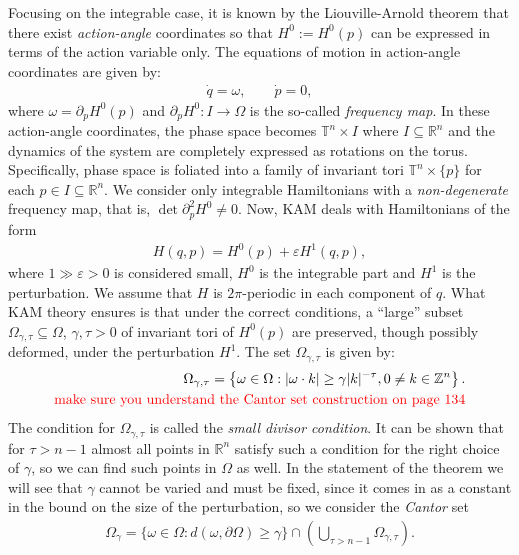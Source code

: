 Focusing on the integrable case, it is known by the Liouville-Arnold theorem that there exist \textit{action-angle} coordinates so that $H^0:=H^0(p)$ can be expressed in terms of the action variable only. The equations of motion in action-angle coordinates are given by:
\begin{align*}
\dot q = \omega, \qquad \dot p = 0,
\end{align*}
where $\omega = \partial_pH^0(p)$ and $\partial_p H^0:I\to\Omega$ is the so-called \textit{frequency map}. In these action-angle coordinates, the phase space becomes $\mathbb T^n\times I$ where $I\subseteq\mathbb R^n$ and the dynamics of the system are completely expressed as rotations on the torus. Specifically, phase space is foliated into a family of invariant tori $\mathbb T^n\times\{p\}$ for each $p\in I\subseteq \mathbb R^n$. We consider only integrable Hamiltonians with a \textit{non-degenerate} frequency map, that is, $\det\partial_p^2 H^0\neq 0$. Now, KAM deals with Hamiltonians of the form
\begin{align*}
H(q,p) = H^0(p) + \varepsilon H^1(q,p),
\end{align*}
where $1\gg\varepsilon>0$ is considered small, $H^0$ is the integrable part and $H^1$ is the perturbation. We assume that $H$ is $2\pi$-periodic in each component of $q$. What KAM theory ensures is that under the correct conditions, a ``large'' subset $\Omega_{\gamma,\tau}\subseteq\Omega$, $\gamma,\tau>0$ of invariant tori of $H^0(p)$ are preserved, though possibly deformed, under the perturbation $H^1$. The set $\Omega_{\gamma,\tau}$ is given by:
\begin{align}\label{eq:smalldivisorcondition}
\Omega_{\gamma,\tau} = \left\{ \omega\in\Omega :
|\omega \cdot k| \ge \gamma|k|^{-\tau}, 0\neq k\in \mathbb Z^n \right\}.\\ \text{\color{red} make sure you understand the Cantor set construction on page 134\color{black}}
\end{align}
The condition for $\Omega_{\gamma,\tau}$ is called the \textit{small divisor condition}. It can be shown that for $\tau>n-1$ almost all points in $\mathbb R^n$ satisfy such a condition for the right choice of $\gamma$, so we can find such points in $\Omega$ as well. In the statement of the theorem we will see that $\gamma$ cannot be varied and must be fixed, since it comes in as a constant in the bound on the size of the perturbation, so we consider the \textit{Cantor} set 
\begin{align*}
\Omega_\gamma=\{\omega\in\Omega: d(\omega,\partial\Omega)\ge\gamma\}\cap\left(\bigcup_{\tau>n-1}\Omega_{\gamma,\tau}\right).
\end{align*}

